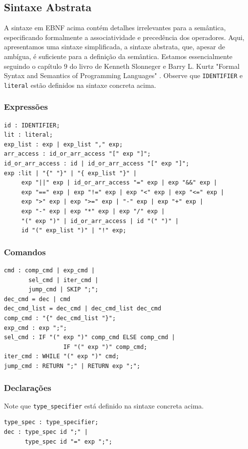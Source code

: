 \documentclass[12pt]{article}
\begin{document}
\subsection{Sintaxe Abstrata}
A sintaxe em EBNF acima contém detalhes irrelevantes para a semântica, especificando formalmente a associatividade e precedência dos operadores. Aqui, apresentamos uma sintaxe simplificada, a sintaxe abstrata, que, apesar de ambígua, é suficiente para a definição da semântica. Estamos essencialmente seguindo o capítulo $9$ do livro de Kenneth Slonneger e Barry L. Kurtz "Formal Syntax and Semantics of Programming Languages" \cite{Chap9}.
Observe que \verb!IDENTIFIER! e \verb!literal! estão definidos na sintaxe concreta acima.
\subsubsection{Expressões}

\begin{verbatim}
id : IDENTIFIER;
lit : literal;
exp_list : exp | exp_list "," exp;
arr_access : id_or_arr_access "[" exp "]";
id_or_arr_access : id | id_or_arr_access "[" exp "]";
exp :lit | "{" "}" | "{ exp_list "}" |
     exp "||" exp | id_or_arr_access "=" exp | exp "&&" exp |
     exp "==" exp | exp "!=" exp | exp "<" exp | exp "<=" exp |
     exp ">" exp | exp ">=" exp | "-" exp | exp "+" exp |
     exp "-" exp | exp "*" exp | exp "/" exp |
     "(" exp ")" | id_or_arr_access | id "(" ")" |
     id "(" exp_list ")" | "!" exp;
\end{verbatim}

\subsubsection{Comandos}
\begin{verbatim}
cmd : comp_cmd | exp_cmd | 
       sel_cmd | iter_cmd |
       jump_cmd | SKIP ";";
dec_cmd = dec | cmd
dec_cmd_list = dec_cmd | dec_cmd_list dec_cmd
comp_cmd : "{" dec_cmd_list "}";
exp_cmd : exp ";";
sel_cmd : IF "(" exp ")" comp_cmd ELSE comp_cmd |
                 IF "(" exp ")" comp_cmd;
iter_cmd : WHILE "(" exp ")" cmd;
jump_cmd : RETURN ";" | RETURN exp ";";
\end{verbatim}

\subsubsection{Declarações}
Note que \verb!type_specifier! está definido na sintaxe concreta acima.
\begin{verbatim}
type_spec : type_specifier;
dec : type_spec id ";" | 
      type_spec id "=" exp ";";
\end{verbatim}
\end{document}
